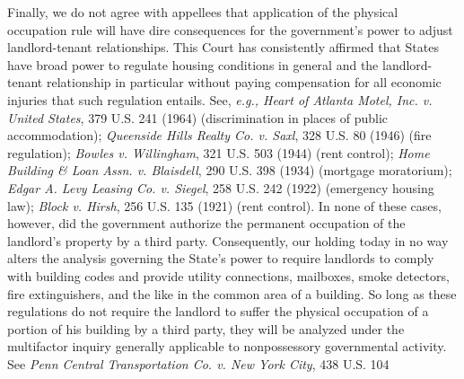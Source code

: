 Finally, we do not agree with appellees that application of the physical
occupation rule will have dire consequences for the government's power to adjust
landlord-tenant relationships. This Court has consistently affirmed that States
have broad power to regulate housing conditions in general and the
landlord-tenant relationship in particular without paying compensation for all
economic injuries that such regulation entails. See, \textit{e.g., Heart of
Atlanta Motel, Inc. v. United States}, 379 U.S. 241 (1964) (discrimination in
places of public accommodation); \textit{Queenside Hills Realty Co. v. Saxl},
328 U.S. 80 (1946) (fire regulation); \textit{Bowles v. Willingham}, 321 U.S.
503 (1944) (rent control); \textit{Home Building \& Loan Assn. v. Blaisdell},
290 U.S. 398 (1934) (mortgage moratorium); \textit{Edgar A. Levy Leasing Co. v.
Siegel}, 258 U.S. 242 (1922) (emergency housing law); \textit{Block v. Hirsh},
256 U.S. 135 (1921) (rent control). In none of these cases, however, did the
government authorize the permanent occupation of the landlord's property by a
third party. Consequently, our holding today in no way alters the analysis
governing the State's power to require landlords to comply with building codes
and provide utility connections, mailboxes, smoke detectors, fire extinguishers,
and the like in the common area of a building. So long as these regulations do
not require the landlord to suffer the physical occupation of a portion of his
building by a third party, they will be analyzed under the multifactor inquiry
generally applicable to nonpossessory governmental activity. See \textit{Penn
Central Transportation Co. v. New York City}, 438 U.S. 104
